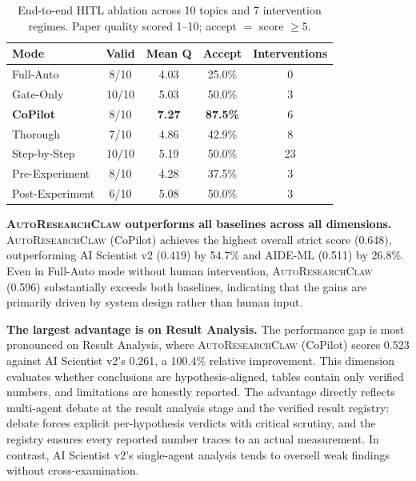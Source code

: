 \documentclass{llmxive}
\providecommand{\system}{\textsc{AutoResearchClaw}}
\begin{document}
\begin{table}[t]
\centering
\small
\begin{tabularx}{\textwidth}{@{}lCCCC@{}}
\toprule
\textbf{Mode} & \textbf{Valid} & \textbf{Mean Q} & \textbf{Accept} & \textbf{Interventions} \\
\midrule
Full-Auto        & 8/10  & 4.03          & 25.0\%          & 0  \\
Gate-Only        & 10/10 & 5.03          & 50.0\%          & 3  \\
\textbf{CoPilot} & 8/10  & \textbf{7.27} & \textbf{87.5\%} & 6 \\
Thorough         & 7/10  & 4.86          & 42.9\%          & 8 \\
Step-by-Step     & 10/10 & 5.19          & 50.0\%          & 23 \\
Pre-Experiment   & 8/10  & 4.28          & 37.5\%          & 3 \\
Post-Experiment  & 6/10  & 5.08          & 50.0\%          & 3 \\
\bottomrule
\end{tabularx}
\caption{End-to-end HITL ablation across 10 topics and 7 intervention regimes.
Paper quality scored 1--10; accept $=$ score $\geq 5$.}
\label{tab:hitl-summary}
\end{table}

\noindent \textbf{\system{} outperforms all baselines across all dimensions.} \system{} (CoPilot) achieves the highest overall strict score (0.648), outperforming AI Scientist v2 (0.419) by 54.7\% and AIDE-ML (0.511) by 26.8\%. Even in Full-Auto mode without human intervention, \system{} (0.596) substantially exceeds both baselines, indicating that the gains are primarily driven by system design rather than human input.

\noindent \textbf{The largest advantage is on Result Analysis.} The performance gap is most pronounced on Result Analysis, where \system{} (CoPilot) scores 0.523 against AI Scientist v2's 0.261, a 100.4\% relative improvement. This dimension evaluates whether conclusions are hypothesis-aligned, tables contain only verified numbers, and limitations are honestly reported. The advantage directly reflects multi-agent debate at the result analysis stage and the verified result registry: debate forces explicit per-hypothesis verdicts with critical scrutiny, and the registry ensures every reported number traces to an actual measurement. In contrast, AI Scientist v2's single-agent analysis tends to oversell weak findings without cross-examination.
\end{document}
